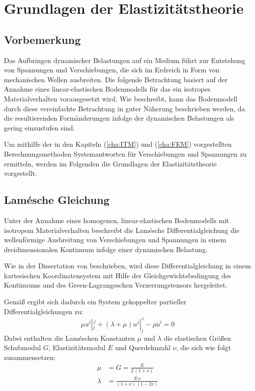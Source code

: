 \chapter{Grundlagen der Elastizitätstheorie}
\label{cha:Grundgleichungen}


\section{Vorbemerkung}
\label{sec:Vorbemerkung_Grundgleichungen}

Das Aufbringen dynamischer Belastungen auf ein Medium führt zur Entstehung von Spannungen und Verschiebungen, die sich im Erdreich in Form von mechanischen Wellen ausbreiten. 
Die folgende Betrachtung basiert auf der Annahme eines linear-elastischen Bodenmodells für das ein isotropes Materialverhalten vorausgesetzt wird. Wie \cite{Haupt1986} beschreibt, kann das Bodenmodell durch diese vereinfachte Betrachtung in guter Näherung beschrieben werden, da die resultierenden Formänderungen infolge der dynamischen Belastungen als gering einzustufen sind. 

Um mithilfe der in den Kapiteln (\ref{cha:ITM}) und (\ref{cha:FEM}) vorgestellten Berechnungsmethoden Systemantworten für Verschiebungen und Spannungen zu ermitteln, werden im Folgenden die Grundlagen der Elastizitätstheorie vorgestellt. 

\section{Lamésche Gleichung}
\label{sec:Lame}
Unter der Annahme eines homogenen, linear-elastischen Bodenmodells mit isotropem Materialverhalten beschreibt die Lamésche Differentialgleichung die wellenförmige Ausbreitung von Verschiebungen und Spannungen in einem dreidimensionalen Kontinuum infolge einer dynamischen Belastung. 

Wie in der Dissertation von \cite{Fruehe2010} beschrieben, wird diese Differentialgleichung in einem kartesischen Koordinatensystem mit Hilfe der Gleichgewichtsbedingung des Kontinuums und des Green-Lagrangeschen Verzerrungstensors hergeleitet. 

Gemäß \cite{Lame1852} ergibt sich dadurch ein System gekoppelter partieller Differentialgleichungen zu: 
	\begin{equation}\label{eq:lame}
	\mu u^{i}{}|_{j}^{\,j} + (\lambda + \mu) u^{j}{}|_{j}^{\,i} - \rho \ddot{u}^{i} = 0
	\end{equation}
Dabei enthalten die Laméschen Konstanten \(\mu\) und \(\lambda\) die elastischen Größen Schubmodul \(G\), Elastizitätsmodul \(E\) und Querdehnzahl \(\nu\), die sich wie folgt zusammensetzen:
\begin{subequations}\label{eq:lame_konstanten}
	\begin{align}
		\mu &= G = \frac{E}{2\,(1+\nu)}  \label{eq:lame_mu}\\
		\lambda &= \frac{E\,\nu}{(1+\nu)\,(1-2\nu)}  \label{eq:lame_lambda}
	\end{align}
\end{subequations}


